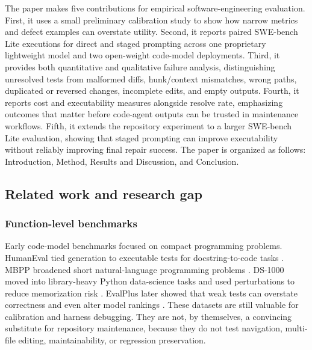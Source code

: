 \documentclass[preprint,12pt]{elsarticle}
\begin{document}
The paper makes five contributions for empirical software-engineering evaluation. First, it uses a small preliminary calibration study to show how narrow metrics and defect examples can overstate utility. Second, it reports paired SWE-bench Lite executions for direct and staged prompting across one proprietary lightweight model and two open-weight code-model deployments. Third, it provides both quantitative and qualitative failure analysis, distinguishing unresolved tests from malformed diffs, hunk/context mismatches, wrong paths, duplicated or reversed changes, incomplete edits, and empty outputs. Fourth, it reports cost and executability measures alongside resolve rate, emphasizing outcomes that matter before code-agent outputs can be trusted in maintenance workflows. Fifth, it extends the repository experiment to a larger SWE-bench Lite evaluation, showing that staged prompting can improve executability without reliably improving final repair success. The paper is organized as follows: Introduction, Method, Results and Discussion, and Conclusion.

\subsection{Related work and research gap}

\subsubsection{Function-level benchmarks}
Early code-model benchmarks focused on compact programming problems. HumanEval tied generation to executable tests for docstring-to-code tasks \cite{chen2021codex}. MBPP broadened short natural-language programming problems \cite{austin2021mbpp}. DS-1000 moved into library-heavy Python data-science tasks and used perturbations to reduce memorization risk \cite{lai2022ds1000}. EvalPlus later showed that weak tests can overstate correctness and even alter model rankings \cite{liu2023evalplus}. These datasets are still valuable for calibration and harness debugging. They are not, by themselves, a convincing substitute for repository maintenance, because they do not test navigation, multi-file editing, maintainability, or regression preservation.
\end{document}
